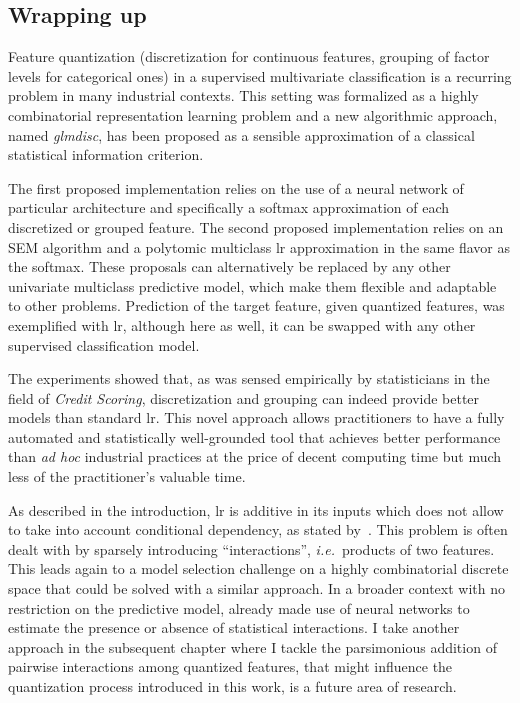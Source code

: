 \subsection{Wrapping up}

Feature quantization (discretization for continuous features, grouping of factor levels for categorical ones) in a supervised multivariate classification is a recurring problem in many industrial contexts. This setting was formalized as a highly combinatorial representation learning problem and a new algorithmic approach, named \textit{glmdisc}, has been proposed as a sensible approximation of a classical statistical information criterion.

The first proposed implementation relies on the use of a neural network of particular architecture and specifically a softmax approximation of each discretized or grouped feature. The second proposed implementation relies on an SEM algorithm and a polytomic multiclass \gls{lr} approximation in the same flavor as the softmax. These proposals can alternatively be replaced by any other univariate multiclass predictive model, which make them flexible and adaptable to other problems. Prediction of the target feature, given quantized features, was exemplified with \gls{lr}, although here as well, it can be swapped with any other supervised classification model.

The experiments showed that, as was sensed empirically by statisticians in the field of \textit{Credit Scoring}, discretization and grouping can indeed provide better models than standard \gls{lr}. This novel approach allows practitioners to have a fully automated and statistically well-grounded tool that achieves better performance than \textit{ad hoc} industrial practices at the price of decent computing time but much less of the practitioner's valuable time.

As described in the introduction, \gls{lr} is additive in its inputs which does not allow to take into account conditional dependency, as stated by~\cite{berry2010testing}. This problem is often dealt with by sparsely introducing ``interactions'', \textit{i.e.}\ products of two features. This leads again to a model selection challenge on a highly combinatorial discrete space that could be solved with a similar approach. In a broader context with no restriction on the predictive model, \cite{tsang2018detecting} already made use of neural networks to estimate the presence or absence of statistical interactions. I take another approach in the subsequent chapter where I tackle the parsimonious addition of pairwise interactions among quantized features, that might influence the quantization process introduced in this work, is a future area of research.




\printbibliography[heading=subbibliography, title=References of Chapter 3]

